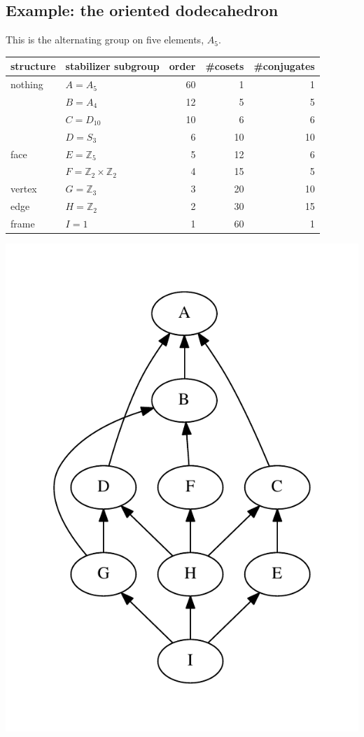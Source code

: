 \documentclass[11pt,oneside]{article}
\newcommand{\Integer}{\mathbb{Z}}
\begin{document}
\subsection{Example: the oriented dodecahedron}

This is the alternating group on five elements, $A_5.$

\begin{samepage}
\begin{center}
\begin{tabular}{ |l|l|r|r|r| }
\hline
structure & stabilizer subgroup & order & \#cosets & \#conjugates \\
\hline
\hline
nothing     & $A=A_5$ &       60        &  1      &   1         \\
    \hline
     & $B=A_4$ &       12        &  5      &   5         \\
    \hline
     & $C=D_{10}$ &       10        &  6      &   6         \\
    \hline
     & $D=S_3$ &       6        &  10      &   10         \\
    \hline
face     & $E=\Integer_5$ &       5        &  12      &   6      \\
    \hline
     & $F=\Integer_2\times\Integer_2$ &       4        &  15      &   5     \\
    \hline
vertex     & $G=\Integer_3$ &       3        &  20      &   10    \\
    \hline
edge     & $H=\Integer_2$ &       2        &  30      &   15         \\
    \hline
    frame & $I=1$ &       1        &  60      &   1       \\
\hline
\end{tabular}
\end{center}
\end{samepage}

\begin{center}
\includegraphics[width=0.4\columnwidth]{subgroups_alt5.pdf} 
\end{center}
\end{document}
